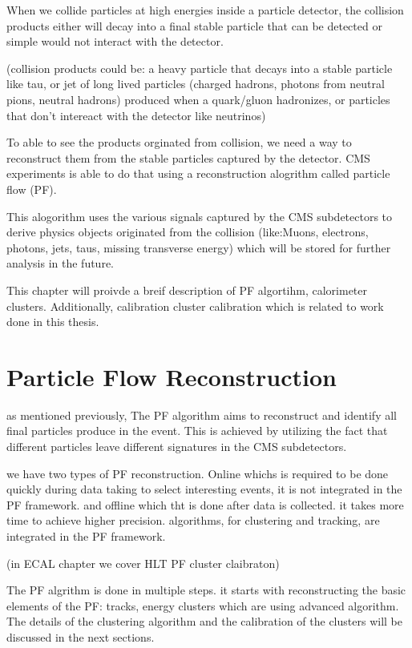 
When we collide particles at high energies inside a particle detector, the collision products either will decay into a final stable particle that can be detected or
simple would not interact with the detector. 

(collision products could be: a heavy particle that decays into a stable particle like tau,
or jet of long lived particles (charged hadrons, photons from neutral pions, neutral hadrons) produced when a quark/gluon hadronizes,
or particles that don't intereact with the detector like neutrinos)

To able to see the products orginated from collision, we need a way to reconstruct them from the stable particles captured by the detector.
CMS experiments is able to do that using a reconstruction alogrithm called particle flow (PF).

This alogorithm uses the various signals captured by the CMS subdetectors to derive physics objects originated from the collision (like:Muons, electrons, photons, jets, taus, missing transverse energy)
which will be stored for further analysis in the future.

This chapter will proivde a breif description of PF algortihm, calorimeter clusters. Additionally, calibration cluster calibration which is related to work done in this thesis.  

\section{Particle Flow Reconstruction}

as mentioned previously, The PF algorithm aims to reconstruct and identify all final particles produce in the event.
This is achieved by utilizing the fact that different particles leave different signatures in the CMS subdetectors.

we have two types of PF reconstruction. Online whichs is required to be done quickly during data taking to select interesting events, it is not integrated in the PF framework.
and offline which tht is done after data is collected. it takes more time to achieve higher precision. algorithms, for clustering and tracking, are integrated in the PF framework.

(in ECAL chapter we cover HLT PF cluster claibraton)

The PF algrithm is done in multiple steps.
it starts with reconstructing the basic elements of the PF: tracks, energy clusters which are using advanced algorithm.
The details of the clustering algorithm and the calibration of the clusters will be discussed in the next sections.

